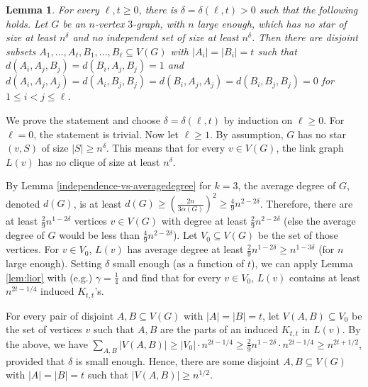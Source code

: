 \documentclass[11pt]{article}
\let\oldendproof\endproof
\renewenvironment{proof}[1][\proofname]{%
	\oldproof[\bf #1]%
}{\oldendproof}
\theoremstyle{plain}
\newtheorem{lemma}[theorem]{Lemma}
\begin{document}
\begin{lemma} \label{main-case-2}
    For every $\ell, t \geq 0$, there is $\delta=\delta(\ell,t) > 0$ such that the following holds. Let $G$ be an $n$-vertex $3$-graph, with $n$ large enough, which has no star of size at least $n^{\delta}$ and no independent set of size at least $n^{\delta}$. Then there are disjoint subsets $A_1, \dots, A_{\ell}, B_1, \dots, B_{\ell} \subseteq V(G)$ with $|A_i|=|B_i|=t$ such that $d(A_i,A_j,B_j) = d(B_i,A_j,B_j) = 1$ and $d(A_i,A_j,A_j) = d(A_i,B_j,B_j) = d(B_i,A_j,A_j) = d(B_i,B_j,B_j) = 0$ for $1 \leq i<j \leq \ell$.
\end{lemma}
\begin{proof}
    We prove the statement and choose $\delta = \delta(\ell,t)$ by induction on $\ell \geq 0$. 
    For $\ell=0$, the statement is trivial. Now let $\ell \geq 1$.
    By assumption, $G$ has no star $(v,S)$ of size $|S| \geq n^{\delta}$. This means that for every $v \in V(G)$, the link graph $L(v)$ has no clique of size at least $n^{\delta}$.
    
    By Lemma \ref{independence-vs-averagedegree} for $k=3$, the average degree of $G$, denoted $d(G)$, is at least $d(G) \geq (\frac{2n}{3\alpha(G)})^2 \geq \frac{4}{9} n^{2-2\delta}$. Therefore, there are at least $\frac{2}{9} n^{1-2\delta}$ vertices $v \in V(G)$ with degree at least 
    $\frac{2}{9} n^{2-2\delta}$ (else the average degree of $G$ would be less than $\frac{4}{9} n^{2-2\delta}$). Let 
    $V_0 \subseteq V(G)$ be the set of those vertices. For $v \in V_0$, $L(v)$ has average degree at least $\frac{2}{9} n^{1-2\delta} \geq n^{1-3\delta}$ (for $n$ large enough). Setting $\delta$ small enough (as a function of $t$), we can apply Lemma \ref{lem:lior} with (e.g.) $\gamma = \frac{1}{4}$ and find that for every $v \in V_0$, $L(v)$ contains at least $n^{2t-1/4}$ induced $K_{t,t}$'s.

    For every pair of disjoint $A, B \subseteq V(G)$ with $|A|=|B|=t$, let $V(A, B) \subseteq V_0$ be the set of vertices $v$ such that $A,B$ are the parts of an induced $K_{t,t}$ in $L(v)$. 
    By the above, we have $\sum_{A,B}|V(A,B)| \geq 
    |V_0| \cdot n^{2t-1/4} \geq \frac{2}{9}n^{1-2\delta} \cdot n^{2t-1/4} \geq n^{2t+1/2}$, provided that $\delta$ is small enough.  
    Hence, there are some disjoint $A, B \subseteq V(G)$ with $|A|=|B|=t$ such that $|V(A, B)| \geq n^{1/2}$.
    

\end{proof}
\end{document}
